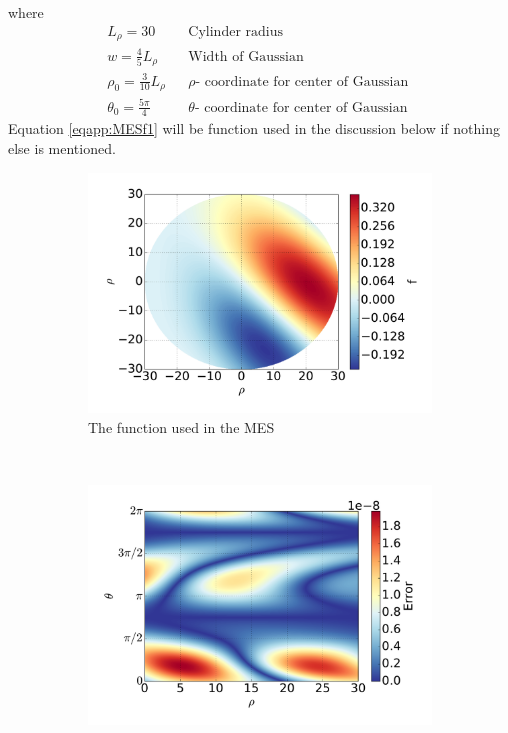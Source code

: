 %
where
%
\begin{align*}
    &L_\rho = 30&
    &\text{
        Cylinder radius
    }&
    \\
    &w = \frac{4}{5}L_\rho&
    &\text{
        Width of Gaussian
    }&
    \\
    &\rho_0 = \frac{3}{10}L_\rho&
    &
    \rho
    \text{
        - coordinate for center of Gaussian
    }&
    \\
    &\theta_0 = \frac{5\pi}{4}&
    &
    \theta
    \text{
        - coordinate for center of Gaussian
    }&
\end{align*}
%
Equation \ref{eqapp:MESf1} will be function used in the discussion below if nothing else is mentioned.
%
\begin{figure}[t!]
    \centering
    \begin{subfigure}[t]{0.45\textwidth}
        \centering
        \includegraphics[width=1.0\textwidth]{fig/f}
        \caption{The function used in the MES}
    \end{subfigure}%
    ~
    \begin{subfigure}[t]{0.45\textwidth}
        \centering
        \includegraphics[width=1.0\textwidth]{fig/err}

\end{subfigure}
\end{figure}
